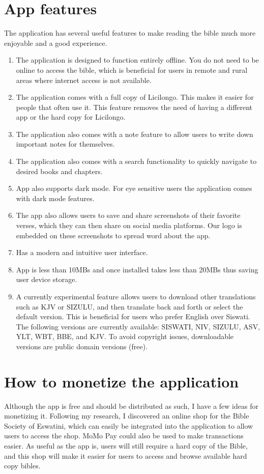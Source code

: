 \documentclass[11pt]{report}
\begin{document}
    \section*{App features}
    The application has several useful features to make reading the bible much more enjoyable and a good experience.
    \begin{enumerate}
        \item The application is designed to function entirely offline.
        You do not need to be online to access the bible, which is beneficial for users in remote and rural areas where
        internet access is not available.
        \item The application comes with a full copy of Licilongo.
        This makes it easier for people that often use it.
        This feature removes the need of having a different app or the hard copy for Licilongo.
        \item The application also comes with a note feature to allow users to write down important notes for
        themselves.
        \item The application also comes with a search functionality to quickly navigate to desired books and chapters.
        \item App also supports dark mode.
        For eye sensitive users the application comes with dark mode features.
        \item The app also allows users to save and share screenshots of their favorite verses, which they can then
        share on social media platforms.
        Our logo is embedded on these screenshots to spread word about the app.
        \item Has a modern and intuitive user interface.
        \item App is less than 10MBs and once installed takes less than 20MBs thus saving user device storage.
        \item A currently experimental feature allows users to download other translations such as KJV or SIZULU, and
        then translate back and forth or select the default version.
        This is beneficial for users who prefer English over Siswati.
        The following versions are currently available: SISWATI, NIV, SIZULU, ASV, YLT, WBT, BBE, and KJV\@.
        To avoid copyright issues, downloadable versions are public domain versions (free).
    \end{enumerate}

    \section*{How to monetize the application}
    Although the app is free and should be distributed as such, I have a few ideas for monetizing it.
    Following my research, I discovered an online shop for the Bible Society of Eswatini, which can easily be integrated
    into the application to allow users to access the shop.
    MoMo Pay could also be used to make transactions easier.
    As useful as the app is, users will still require a hard copy of the Bible, and this shop will make it easier for
    users to access and browse available hard copy bibles.\\
\end{document}
